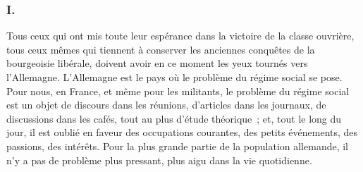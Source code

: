 \documentclass[french,twoside]{book} %
\begin{document}
\subsubsection[I.]{I.}
\noindent Tous ceux qui ont mis toute leur espérance dans la victoire de la classe ouvrière, tous ceux mêmes qui tiennent à conserver les anciennes conquêtes de la bourgeoisie libérale, doivent avoir en ce moment les yeux tournés vers l'Allemagne. L'Allemagne est le pays où le problème du régime social se pose. Pour nous, en France, et même pour les militants, le problème du régime social est un objet de discours dans les réunions, d'articles dans les journaux, de discussions dans les cafés, tout au plus d'étude théorique ; et, tout le long du jour, il est oublié en faveur des occupations courantes, des petits événe­ments, des passions, des intérêts. Pour la plus grande partie de la population allemande, il n'y a pas de problème plus pressant, plus aigu dans la vie quotidienne.\par
\end{document}
